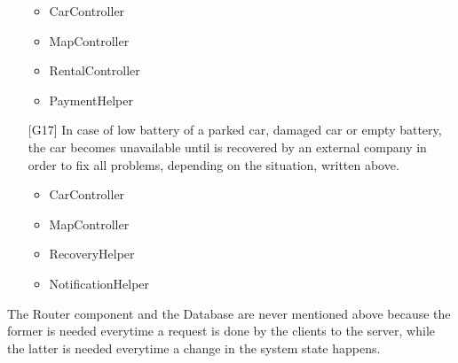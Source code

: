\begin{itemize}
		\begin{itemize}
			\item CarController
			\item MapController
			\item RentalController
			\item PaymentHelper
		\end{itemize}
	\item[{[G17]}] In case of low battery of a parked car, damaged car or empty battery, the car becomes unavailable until is recovered by an external company in order to fix all problems, depending on the situation, written above. 
		\begin{itemize}
			\item CarController
			\item MapController
			\item RecoveryHelper
			\item NotificationHelper
		\end{itemize}
\end{itemize}

The Router component and the Database are never mentioned above because the former is needed everytime a request is done by the clients to the server, while the latter is needed everytime a change in the system state happens.
